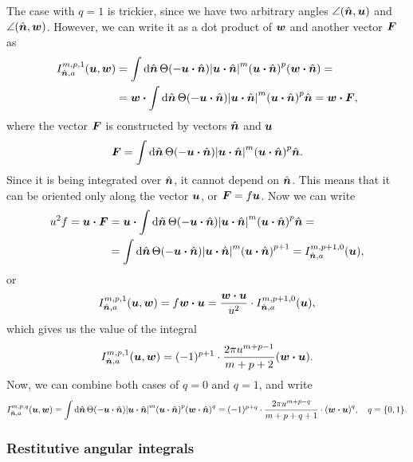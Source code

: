 \documentclass[aps,prl,preprint,groupedaddress,10pt]{revtex4-2}
\begin{document}
The case with $q=1$ is trickier, since we have two arbitrary angles $\angle(\hat{\vb*{n}},\vb*{u})$ and
$\angle(\hat{\vb*{n}},\vb*{w})$. However, we can write it as a dot product of $\vb*{w}$ and another vector
$\vb*{F}$ as
\begin{equation}
    \begin{split}
        I_{\bn,a}^{m,p,1}(\bu,\bw)&=\int\dd{\bn}\Theta\pqty{-\bu\vdot\bn}
        \abs{\bu\vdot\bn}^m\pqty{\bu\vdot\bn}^p\pqty{\bw\vdot\bn}=\\
        &=\bw\vdot\int\dd{\bn}\Theta\pqty{-\bu\vdot\bn}
        \abs{\bu\vdot\bn}^m\pqty{\bu\vdot\bn}^p\bn=\bw\vdot\bF,
    \end{split}
\end{equation}
where the vector $\vb*{F}$ is constructed by vectors $\hat{\vb*{n}}$ and $\vb*{u}$
\begin{equation}
    \bF = \int\dd{\bn}\Theta\pqty{-\bu\vdot\bn}\abs{\bu\vdot\bn}^m\pqty{\bu\vdot\bn}^p\bn.
\end{equation}
Since it is being integrated
over $\hat{\vb*{n}}$, it cannot depend on $\hat{\vb*{n}}$. This means that it can be oriented only along the
vector $\vb*{u}$, or $\vb*{F}=f\vb*{u}$. Now we can write
\begin{equation}
    \begin{split}
        u^2f = \bu\vdot\bF &= \bu\vdot
        \int\dd{\bn}\Theta\pqty{-\bu\vdot\bn}\abs{\bu\vdot\bn}^m\pqty{\bu\vdot\bn}^p\bn=\\
        &=\int\dd{\bn}\Theta\pqty{-\bu\vdot\bn}\abs{\bu\vdot\bn}^m\pqty{\bu\vdot\bn}^{p+1}=
        I_{\bn,a}^{m,p+1,0}(\bu),
    \end{split}
\end{equation}
or
\begin{equation}
    I_{\bn,a}^{m,p,1}(\bu,\bw)=f\bw\vdot\bu=\frac{\bw\vdot\bu}{u^2}
    \cdot I_{\bn,a}^{m,p+1,0}(\bu),
\end{equation}
which gives us the value of the integral
\begin{equation}
    I_{\bn,a}^{m,p,1}(\bu,\bw)=(-1)^{p+1}\cdot\frac{2\pi u^{m+p-1}}{m+p+2}\pqty{\bw\vdot\bu}.
\end{equation}
Now, we can combine both cases of $q=0$ and $q=1$, and write
\begin{equation}
    I_{\bn,a}^{m,p,q}(\bu,\bw)=\int\dd{\bn}\Theta\pqty{-\bu\vdot\bn}
    \abs{\bu\vdot\bn}^m\pqty{\bu\vdot\bn}^p\pqty{\bw\vdot\bn}^q=
    (-1)^{p+q}\cdot\frac{2\pi u^{m+p-q}}{m+p+q+1}
    \cdot\pqty{\bw\vdot\bu}^{q},\quad q=\Bqty{0,1}.
\end{equation}

\subsubsection{Restitutive angular integrals}
\end{document}
